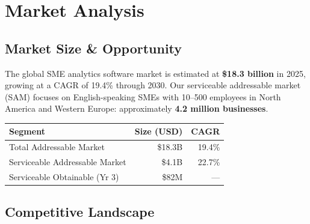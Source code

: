 \section{\sectionicon{\faChartBar}Market Analysis}

\subsection{Market Size \& Opportunity}

\noindent
\begin{minipage}[t]{0.62\linewidth}
The global SME analytics software market is estimated at \textbf{\$18.3 billion} in 2025,
growing at a CAGR of 19.4\% through 2030. Our serviceable addressable market (SAM)
focuses on English-speaking SMEs with 10--500 employees in North America and Western
Europe: approximately \textbf{4.2 million businesses}.

\vspace{6pt}
\begin{tabular}{@{}lrr@{}}
  \toprule
  \rowcolor{NexaNavy}
  \color{white}\textbf{Segment} &
  \color{white}\textbf{Size (USD)} &
  \color{white}\textbf{CAGR} \\
  \midrule
  Total Addressable Market & \$18.3B & 19.4\% \\
  \rowcolor{NexaLight}
  Serviceable Addressable Market & \$4.1B & 22.7\% \\
  Serviceable Obtainable (Yr 3) & \$82M & --- \\
  \bottomrule
\end{tabular}
\end{minipage}\hfill
\begin{minipage}[t]{0.34\linewidth}
\end{minipage}

\par

\subsection{Competitive Landscape}

